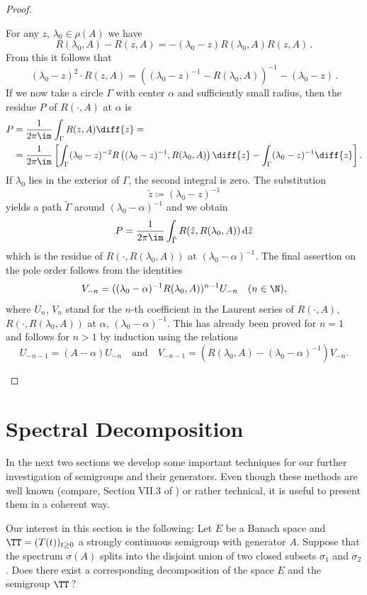 \begin{proof}
\begin{enumerate}[\upshape (i), wide, labelindent=.25em]
For any $z$,  $\lambda_{0} \in \rho(A)$ we have 
%
\[
R(\lambda_{0},A) - R(z,A)= -(\lambda_{0}-z)R(\lambda_{0},A)R(z,A)\,.
\]
%
From this it follows that 
%
\[
	(\lambda_{0}-z)^2\cdot R(z,A) = \left((\lambda_{0}-z)^{-1}-R(\lambda_{0},A)\right)^{-1} - (\lambda_{0}-z)\,.
\]
%
If we now take a circle $\Gamma$ with center $\alpha$ and sufficiently small radius, then the residue $P$ of\/ $R(\cdot,A)$ at $\alpha$ is
\begin{align*}
P &=  \frac{1}{2\pi\im } \int_{\Gamma} R(z,A)   \diff{z} = \\
&=  \frac{1}{2\pi\im } \left[\int_{\Gamma} (\lambda_{0}-z)^{-2}R\left((\lambda_{0}-z)^{-1}, R(\lambda_{0},A)\right)  \diff{z}   - 
   \int_{\Gamma}(\lambda_{0}-z)^{-1} \diff{z} \right] . 
\end{align*}
If\/ $\lambda_{0}$ lies in the exterior of\/ $\Gamma$, the second integral is zero.
The substitution 
%
\[
	 \tilde{z} \coloneqq (\lambda_{0} - z)^{-1} 
\]
%
yields a path $\tilde{\Gamma}$ around $(\lambda_{0}-\alpha)^{-1}$ and we obtain
\[
P = \frac{1}{2\pi\im } \int_{\tilde{\Gamma}} R(\tilde{z},R(\lambda_{0},A)) \, \mathrm{d}\tilde{z}
\]
which is the residue of\/ $R(\cdot,R(\lambda_{0},A))$ at $(\lambda_{0}-\alpha)^{-1}$.
The final assertion on the pole order follows from the identities
\[
V_{-n} = ((\lambda_{0}-\alpha)^{-1}R(\lambda_{0},A))^{n-1}U_{-n} \quad (n \in \N) ,
\]
where $U_{n}$, \resp $V_{n}$ stand for the $ n $-th coefficient in the Laurent series of\/ $R(\cdot,A)$, \resp $R(\cdot,R(\lambda_{0},A))$ at $\alpha$, \resp $(\lambda_{0}-\alpha)^{-1}$.
This has already been proved for $n = 1$ and follows for $n > 1$ by induction using the relations
\[
U_{-n-1} = (A - \alpha)U_{-n} 
\quad \text{and} \quad 
V_{-n-1} = \left(R(\lambda_{0},A) - (\lambda_{0}-\alpha)^{-1}\right)V_{-n} .
\]
\qedhere
\end{enumerate}
\end{proof}
\section{Spectral Decomposition}\label{sec:a3-3}%
In the next two sections we develop some important techniques for our further investigation of semigroups and their generators.
Even though these methods are well known (compare, \eg Section VII.3 of \textcite{dunfordschwartz:1958}) or rather technical, it is useful to present them in a coherent way.

Our interest in this section is the following: Let $E$ be a Banach space and $\TT = (T(t))_{t \geq 0}$ a strongly continuous semigroup with generator $A$.
Suppose that the spectrum $\sigma(A)$ splits into the disjoint union of two closed subsets $\sigma_{1}$ and $\sigma_{2}$.
Does there exist a corresponding decomposition of the space $E$ and the semigroup $\TT$\,?

